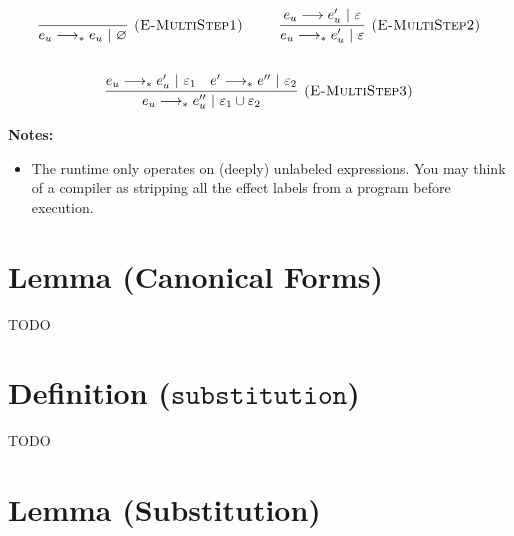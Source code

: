 \documentclass{llncs}
\newcommand{\keywadj}[1]{\mathtt{#1}}
\begin{document}
\[
\begin{array}{c}

	\infer[\textsc{(E-MultiStep1)}]
	{e_u \longrightarrow_* e_u~|~\varnothing}
	{} ~~~~~~~~
	
	\infer[\textsc{(E-MultiStep2)}]
	{e_u \longrightarrow_* e_u'~|~\varepsilon}
	{e_u \longrightarrow e_u'~|~\varepsilon} \\[5ex]

	\infer[\textsc{(E-MultiStep3)}]
	{e_u \longrightarrow_* e_u''~|~\varepsilon_1 \cup \varepsilon_2}
	{e_u \longrightarrow_* e_u'~|~\varepsilon_1 & e' \longrightarrow_* e''~|~\varepsilon_2}

\end{array}
\]

\noindent \textbf{Notes:}
\begin{itemize}
	\item The runtime only operates on (deeply) unlabeled expressions. You may think of a compiler as stripping all the effect labels from a program before execution.
\end{itemize}
















\section{Lemma (Canonical Forms)}

TODO














\section{Definition ($\keywadj{substitution}$)}

TODO













\section{Lemma (Substitution)}
\end{document}
